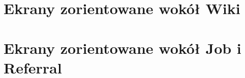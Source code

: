 \documentclass[oneside]{scrreprt}
\begin{document}
\section{Ekrany zorientowane wokół Wiki}
\begin{center}
\end{center}

\section{Ekrany zorientowane wokół Job i Referral}
\begin{center}
\end{center}
\end{document}
